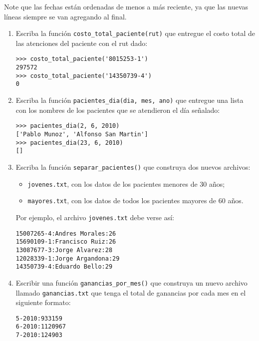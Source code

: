 Note que las fechas están ordenadas de menos a más reciente, ya que las
nuevas líneas siempre se van agregando al final.

\begin{enumerate}
\item
  Escriba la función \lstinline!costo_total_paciente(rut)! que entregue
  el costo total de las atenciones del paciente con el rut dado:

\begin{lstlisting}
>>> costo_total_paciente('8015253-1')
297572
>>> costo_total_paciente('14350739-4')
0
\end{lstlisting}
\item
  Escriba la función \lstinline!pacientes_dia(dia, mes, ano)! que
  entregue una lista con los nombres de los pacientes que se atendieron
  el día señalado:

\begin{lstlisting}
>>> pacientes_dia(2, 6, 2010)
['Pablo Munoz', 'Alfonso San Martin']
>>> pacientes_dia(23, 6, 2010)
[]
\end{lstlisting}
\item
  Escriba la función \lstinline!separar_pacientes()! que construya dos
  nuevos archivos:

  \begin{itemize}
  \item
    \lstinline!jovenes.txt!, con los datos de los pacientes menores de
    30 años;
  \item
    \lstinline!mayores.txt!, con los datos de todos los pacientes
    mayores de 60 años.
  \end{itemize}

  Por ejemplo, el archivo \lstinline!jovenes.txt! debe verse así:

\begin{lstlisting}[language=file,inputencoding=utf8/latin1]
15007265-4:Andres Morales:26
15690109-1:Francisco Ruiz:26
13087677-3:Jorge Alvarez:28
12028339-1:Jorge Argandona:29
14350739-4:Eduardo Bello:29
\end{lstlisting}
\item
  Escribir una función \lstinline!ganancias_por_mes()! que construya un
  nuevo archivo llamado \lstinline!ganancias.txt! que tenga el total de
  ganancias por cada mes en el siguiente formato:

\begin{lstlisting}[language=file]
5-2010:933159
6-2010:1120967
7-2010:124903
\end{lstlisting}
\end{enumerate}
